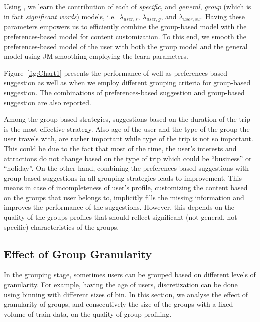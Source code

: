 Using \acswlm, we learn the contribution of each of \emph{specific}, and \emph{general}, \emph{group} (which is in fact \emph{significant words}) models, i.e.\ $\lambda_{user,s}$, $\lambda_{user,g}$, and $\lambda_{user,sw}$. Having these parameters empowers us to efficiently combine the group-based model with the preferences-based model for content customization. To this end, we smooth the preferences-based model of the user with both the group model and the general model using JM-smoothing \citep{Zhai:2001} employing the learn parameters.


Figure~\ref{fig:Chart1} presents the performance of well as preferences-based suggestion as well as when we employ different grouping criteria for group-based suggestion. The combinations of preferences-based suggestion and group-based suggestion are also reported. 

Among the group-based strategies, suggestions based on the duration of the trip is the most effective strategy. Also age of the user and the type of the group the user travels with, are rather important while type of the trip is not so important. This could be due to the fact that most of the time, the user's interests and attractions do not change based on the type of trip which could be ``business'' or ``holiday''. 
On the other hand, combining the preferences-based suggestions with group-based suggestions in all grouping strategies leads to improvement. This means in case of incompleteness of user's profile, customizing the content based on the groups that user belongs to, implicitly fills the missing information and improves the performance of the suggestions. However, this depends on the quality of the groups profiles that should reflect significant (not general, not specific) characteristics of the groups.

\subsection{Effect of Group Granularity}
\label{sec:gg}
In the grouping stage, sometimes users can be grouped based on different levels of granularity. For example, having the age of users, discretization can be done using binning with different sizes of bin. In this section, we analyse the effect of granularity of groups, and consecutively the size of the groups with a fixed volume of train data, on the quality of group profiling.

